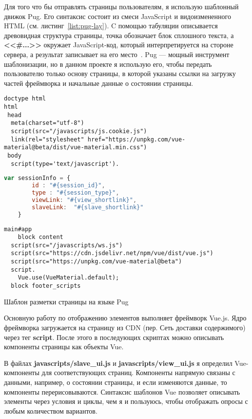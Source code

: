 Для того что бы отправлять страницы пользователям, я использую шаблонный движок Pug. Его синтаксис состоит из смеси JavaScript и видоизмененного HTML (см. листинг~\ref{list:pug-lay}). C помощью табуляции описывается древовидная структура страницы, точка обозначает блок сплошного текста, а \textbf{<<\#{...}>>} окружает JavaScript-код, который интерпретируется на стороне сервера, а результат записывает на его место~\autocite{pug}. Pug --- мощный инструмент шаблонизации, но в данном проекте я использую его, чтобы передать пользователю только основу страницы, в которой указаны ссылки на загрузку частей фреймворка и начальные данные о состоянии страницы.
 \begin{ListingEnv}
	\begin{lstlisting}[language=pug]
doctype html
html
 head
  meta(charset="utf-8")
  script(src="/javascripts/js.cookie.js")
  link(rel="stylesheet" href="https://unpkg.com/vue-material@beta/dist/vue-material.min.css")    
 body
  script(type='text/javascript').
  \end{lstlisting}
  \begin{lstlisting}[language=JavaScript]
     var sessionInfo = {
	 	id : "#{session_id}",
	 	type : "#{session_type}",
		viewLink: "#{view_shortlink}",
		slaveLink:  "#{slave_shortlink}"
	}  
\end{lstlisting}
\begin{lstlisting}[language=pug]
  main#app 
	block content
  script(src="/javascripts/ws.js")
  script(src="https://cdn.jsdelivr.net/npm/vue/dist/vue.js")
  script(src="https://unpkg.com/vue-material@beta")
  script.
	Vue.use(VueMaterial.default);
  block footer_scripts
	\end{lstlisting}
	\caption{Шаблон разметки страницы на языке Pug}
	\label{list:pug-lay}
\end{ListingEnv}      

Основную работу по отображению элементов выполняет фреймворк Vue.js. Ядро фреймворка загружается на страницу из CDN (пер. Сеть доставки содержимого) через тег \textbf{script}. После этого в последующих скриптах можно описывать компоненты страницы как объекты Vue. 

В файлах \textbf{javascripts/slave\_ui.js} и \textbf{javascripts/view\_ui.js} я определил Vue-компоненты для соответствующих страниц. Компоненты напрямую связаны с данными, например, о состоянии страницы, и если изменяются данные, то компоненты перерисовываются. Синтаксис шаблонов Vue позволяет описывать элементы через условия и циклы, чем я и пользуюсь, чтобы отображать опросы с любым количеством вариантов.

